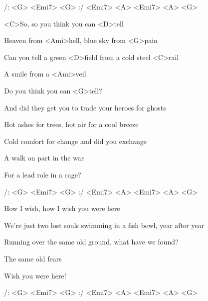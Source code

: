 
/: <G> <Emi7> <G> :/ <Emi7> <A> <Emi7> <A> <G>

\zs
<C>So, so you think you can <D>tell

Heaven from <Ami>hell, blue sky from <G>pain

Can you tell a green <D>field from a cold steel <C>rail

A smile from a <Ami>veil

Do you think you can <G>tell?
\ks

\zs
And did they get you to trade your heroes for ghosts

Hot ashes for trees, hot air for a cool breeze

Cold comfort for change
and did you exchange

A walk on part in the war

For a lead role in a cage?
\ks

/: <G> <Emi7> <G> :/ <Emi7> <A> <Emi7> <A> <G>

\zs
How I wish, how I wish you were here

We're just two lost souls swimming in a fish bowl, year after year

Running over the same old ground, what have we found?

The same old fears

Wish you were here!
\ks

/: <G> <Emi7> <G> :/ <Emi7> <A> <Emi7> <A> <G>


\kp
